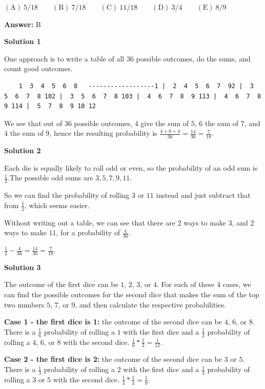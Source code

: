\begin{enumerate}
 $\mathrm{(A)}\ 5/18\qquad\mathrm{(B)}\ 7/18\qquad\mathrm{(C)}\ 11/18\qquad\mathrm{(D)}\ 3/4\qquad\mathrm{(E)}\ 8/9$

 \textbf{Answer: }B



\textbf{Solution 1}

One approach is to write a table of all $36$ possible outcomes, do the sums, and count good outcomes.

 \begin{verbatim}
	1  3  4  5  6  8   ------------------1 |  2  4  5  6  7  92 |  3  5  6  7  8 102 |  3  5  6  7  8 103 |  4  6  7  8  9 113 |  4  6  7  8  9 114 |  5  7  8  9 10 12
\end{verbatim}

We see that out of $36$ possible outcomes, $4$ give the sum of $5$, $6$ the sum of $7$, and $4$ the sum of $9$, hence the resulting probability is $\frac{4+6+4}{36}=\frac{14}{36}=\boxed{\frac{7}{18}}$.

 



\textbf{Solution 2}

Each die is equally likely to roll odd or even, so the probability of an odd sum is $\frac{1}{2}$.The possible odd sums are $3, 5, 7, 9, 11$.

 So we can find the probability of rolling $3$ or $11$ instead and just subtract that from $\frac{1}{2}$, which seems easier. 

 Without writing out a table, we can see that there are 2 ways to make $3$, and 2 ways to make $11$, for a probability of $\frac{4}{36}$.

 $\frac{1}{2}-\frac{4}{36}=\frac{14}{36}=\boxed{\frac{7}{18}}$.

 



\textbf{Solution 3}

The outcome of the first dice can be $1$, $2$, $3$, or $4$. For each of these $4$ cases, we can find the possible outcomes for the second dice that makes the sum of the top two numbers $5$, $7$, or $9$, and then calculate the respective probabilities. 

 \textbf{Case 1 - the first dice is 1:} the outcome of the second dice can be $4$, $6$, or $8$. There is a $\frac{1}{6}$ probability of rolling a $1$ with the first dice and a $\frac{1}{2}$ probability of rolling a $4$, $6$, or $8$ with the second dice. $\frac{1}{6}*\frac{1}{2} = \frac{1}{12}.$

 \textbf{Case 2 - the first dice is 2:} the outcome of the second dice can be $3$ or $5$. There is a $\frac{1}{3}$ probability of rolling a $2$ with the first dice and a $\frac{1}{3}$ probability of rolling a $3$ or $5$ with the second dice. $\frac{1}{3}*\frac{1}{3} = \frac{1}{9}.$


\end{enumerate}
